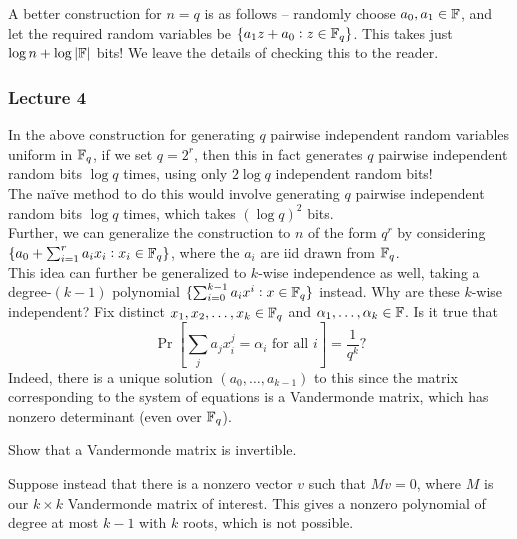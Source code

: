 			A better construction for $n = q$ is as follows -- randomly choose $a_0,a_1 \in \mathbb{F}$, and let the required random variables be $\{ a_1z+a_0 : z \in \mathbb{F}_q \}$. This takes just $\log n + \log |\mathbb{F}|$ bits! We leave the details of checking this to the reader.\\

		
		\subsubsection{Lecture 4}


			In the above construction for generating $q$ pairwise independent random variables uniform in $\mathbb{F}_q$, if we set $q = 2^r$, then this in fact generates $q$ pairwise independent random bits $\log q$ times, using only $2 \log q$ independent random bits!\\
			The na\"{i}ve method to do this would involve generating $q$ pairwise independent random bits $\log q$ times, which takes $(\log q)^2$ bits.\\

			Further, we can generalize the construction to $n$ of the form $q^r$ by considering $\{ a_0 + \sum_{i=1}^r a_i x_i : x_i \in \mathbb{F}_q \}$, where the $a_i$ are iid drawn from $\mathbb{F}_q$.\\
			This idea can further be generalized to $k$-wise independence as well, taking a degree-$(k-1)$ polynomial $\{ \sum_{i=0}^{k-1} a_i x^i : x \in \mathbb{F}_q \}$ instead. Why are these $k$-wise independent? Fix distinct $x_1,x_2,\ldots,x_k \in \mathbb{F}_q$ and $\alpha_1,\ldots,\alpha_k \in \mathbb{F}$. Is it true that
			\[ \Pr\left[\sum_{j} a_j x_i^j = \alpha_i \text{ for all $i$}\right] = \frac{1}{q^k}? \]
			Indeed, there is a unique solution $(a_0,\ldots,a_{k-1})$ to this since the matrix corresponding to the system of equations is a Vandermonde matrix, which has nonzero determinant (even over $\mathbb{F}_q$).

			\begin{exercise}
				Show that a Vandermonde matrix is invertible.
			\end{exercise}
			\begin{solution*}
				Suppose instead that there is a nonzero vector $v$ such that $Mv = 0$, where $M$ is our $k\times k$ Vandermonde matrix of interest. This gives a nonzero polynomial of degree at most $k-1$ with $k$ roots, which is not possible.
			\end{solution*}

